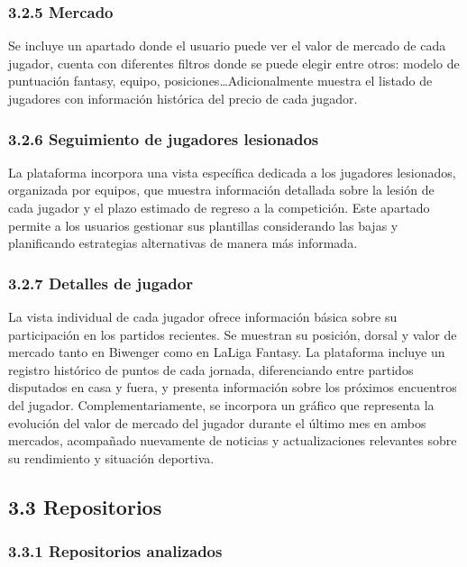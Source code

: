 \subsubsection{3.2.5 Mercado}

Se incluye un apartado donde el usuario puede ver el valor de mercado de cada jugador, 
cuenta con diferentes filtros donde se puede elegir entre otros: modelo de puntuación fantasy, equipo, 
posiciones\ldots Adicionalmente muestra el listado de jugadores con información histórica del precio de 
cada jugador.

\subsubsection{3.2.6 Seguimiento de jugadores lesionados}

La plataforma incorpora una vista específica dedicada a los jugadores lesionados, organizada por 
equipos, que muestra información detallada sobre la lesión de cada jugador y el plazo estimado de 
regreso a la competición. Este apartado permite a los usuarios gestionar sus plantillas considerando 
las bajas y planificando estrategias alternativas de manera más informada.

\subsubsection{3.2.7 Detalles de jugador}

La vista individual de cada jugador ofrece información básica sobre su participación en los partidos 
recientes. Se muestran su posición, dorsal y valor de mercado tanto en Biwenger como en LaLiga 
Fantasy. La plataforma incluye un registro histórico de puntos de cada jornada, diferenciando entre 
partidos disputados en casa y fuera, y presenta información sobre los próximos encuentros del 
jugador. Complementariamente, se incorpora un gráfico que representa la evolución del valor de 
mercado del jugador durante el último mes en ambos mercados, acompañado nuevamente de noticias y 
actualizaciones relevantes sobre su rendimiento y situación deportiva.

\subsection{3.3 Repositorios}

\subsubsection{3.3.1 Repositorios analizados}

